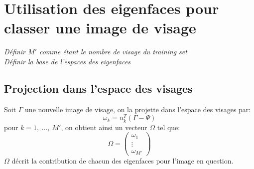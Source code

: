 \documentclass[12pt,french]{article}
\theoremstyle{plain}
\theoremstyle{definition}
\begin{document}
\section{Utilisation des eigenfaces pour classer une image de visage}
\emph{Définir $M'$ comme étant le nombre de visage du training set}\\
\emph{Définir la base de l'espaces des eigenfaces}

\subsection{Projection dans l'espace des visages}
Soit $\Gamma$ une nouvelle image de visage, on la projette dans l'espace des visages par:
$$\omega_k = u_k^T(\Gamma - \Psi)$$
pour $k = 1,~\dots,~M'$, on obtient ainsi un vecteur $\Omega$ tel que:
\[\Omega =
  \begin{pmatrix}
    \omega_1 \\
    \vdots \\
    \omega_{M'}
  \end{pmatrix}
\]
$\Omega$ décrit la contribution de chacun des eigenfaces pour l'image en question.
\end{document}
